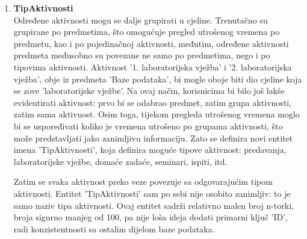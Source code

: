 \documentclass[times, utf8, zavrsni, numeric]{fer}
\begin{document}
\begin{enumerate}[leftmargin=*]
\item \textbf{TipAktivnosti}\\
Određene aktivnosti mogu se dalje grupirati u cjeline. Trenutačno su grupirane po predmetima, što omogućuje pregled utrošenog vremena po predmetu, kao i po pojedinačnoj aktivnosti, međutim, određene aktivnosti predmeta međusobno su povezane ne samo po predmetima, nego i po tipovima aktivnosti. Aktivnost '1. laboratorijska vježba' i '2. laboratorijska vježba', obje iz predmeta 'Baze podataka', bi mogle oboje biti dio cjeline koja se zove 'laboratorijske vježbe'. Na ovaj način, korisnicima bi bilo još lakše evidentirati aktivnost: prvo bi se odabrao predmet, zatim grupa aktivnosti, zatim sama aktivnost. Osim toga, tijekom pregleda utrošenog vremena moglo bi se uspoređivati koliko je vremena utrošeno po grupama aktivnosti, što može predstavljati jako zanimljivu informaciju. Zato se definira novi entitet imena 'TipAktivnosti', koja definira moguće tipove aktivnost: predavanja, laboratorijske vježbe, domaće zadaće, seminari, ispiti, itd.

Zatim se svaka aktivnost preko veze povezuje sa odgovarajućim tipom aktivnosti. Entitet 'TipAktivnosti' sam po sebi nije osobito zanimljiv: to je samo naziv tipa aktivnosti. Ovaj entitet sadrži relativno malen broj n-torki, broja sigurno manjeg od 100, pa nije loša ideja dodati primarni ključ 'ID', radi konzistentnosti sa ostalim dijelom baze podataka.
\end{enumerate}
\end{document}

